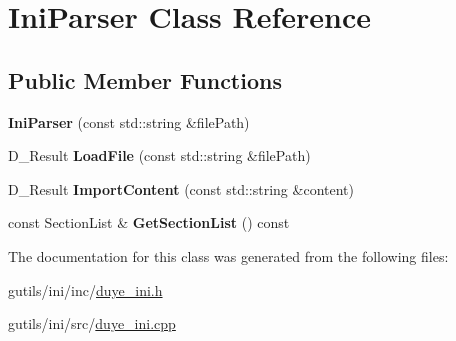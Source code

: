 \hypertarget{class_ini_parser}{\section{Ini\-Parser Class Reference}
\label{class_ini_parser}
}
\subsection*{Public Member Functions}
\begin{DoxyCompactItemize}
\item 
\hypertarget{class_ini_parser_af312e99e13307e8da4c1e605297647c4}{{\bfseries Ini\-Parser} (const std\-::string \&file\-Path)}\label{class_ini_parser_af312e99e13307e8da4c1e605297647c4}

\item 
\hypertarget{class_ini_parser_ac66f1a3325a0df551e127596164fb29a}{D\-\_\-\-Result {\bfseries Load\-File} (const std\-::string \&file\-Path)}\label{class_ini_parser_ac66f1a3325a0df551e127596164fb29a}

\item 
\hypertarget{class_ini_parser_a19ea82b8f7bdbfe988a68124c92a2fbc}{D\-\_\-\-Result {\bfseries Import\-Content} (const std\-::string \&content)}\label{class_ini_parser_a19ea82b8f7bdbfe988a68124c92a2fbc}

\item 
\hypertarget{class_ini_parser_ac91f2619ca5495e4f73d0d0f41dba7b9}{const Section\-List \& {\bfseries Get\-Section\-List} () const }\label{class_ini_parser_ac91f2619ca5495e4f73d0d0f41dba7b9}

\end{DoxyCompactItemize}


The documentation for this class was generated from the following files\-:\begin{DoxyCompactItemize}
\item 
gutils/ini/inc/\hyperlink{duye__ini_8h}{duye\-\_\-ini.\-h}\item 
gutils/ini/src/\hyperlink{duye__ini_8cpp}{duye\-\_\-ini.\-cpp}\end{DoxyCompactItemize}
